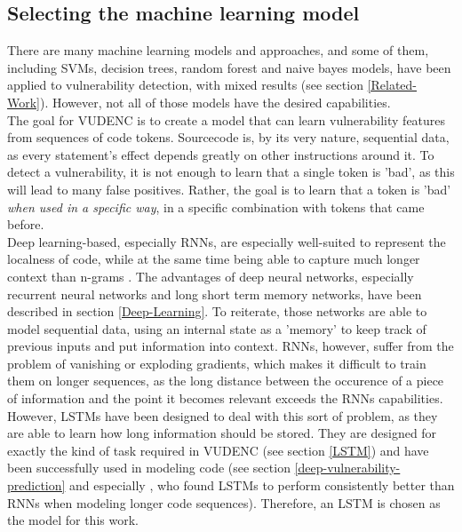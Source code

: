 \documentclass[
a4paper,
pagesize,
pdftex,
12pt,
twoside, %
BCOR=5mm, %
ngerman,
fleqn,
final,
]{scrartcl}
\begin{document}
	\subsection{Selecting the machine learning model}
	There are many machine learning models and approaches, and some of them, including SVMs, decision trees, random forest and naive bayes models, have been applied to vulnerability detection, with mixed results (see section \ref{Related-Work}). However, not all of those models have the desired capabilities.\\
	The goal for VUDENC is to create a model that can learn vulnerability features from sequences of code tokens. Sourcecode is, by its very nature, sequential data, as every statement's effect depends greatly on other instructions around it. To detect a vulnerability, it is not enough to learn that a single token is 'bad', as this will lead to many false positives. Rather, the goal is to learn that a token is 'bad' \textit{when used in a specific way}, in a specific combination with tokens that came before.\\
	Deep learning-based, especially RNNs, are especially well-suited to represent the localness of code, while at the same time being able to capture much longer context than n-grams \cite{Dam.2016}. The advantages of deep neural networks, especially recurrent neural networks and long short term memory networks, have been described in section \ref{Deep-Learning}. To reiterate, those networks are able to model sequential data, using an internal state as a 'memory' to keep track of previous inputs and put information into context. RNNs, however, suffer from the problem of vanishing or exploding gradients, which makes it difficult to train them on longer sequences, as the long distance between the occurence of a piece of information and the point it becomes relevant exceeds the RNNs capabilities. However, LSTMs have been designed to deal with this sort of problem, as they are able to learn how long information should be stored. They are designed for exactly the kind of task required in VUDENC (see section \ref{LSTM}) and have been successfully used in modeling code (see section \ref{deep-vulnerability-prediction} and especially \cite{Dam.2016}, who found LSTMs to perform consistently better than RNNs when modeling longer code sequences). Therefore, an LSTM is chosen as the model for this work.
	
\end{document}
